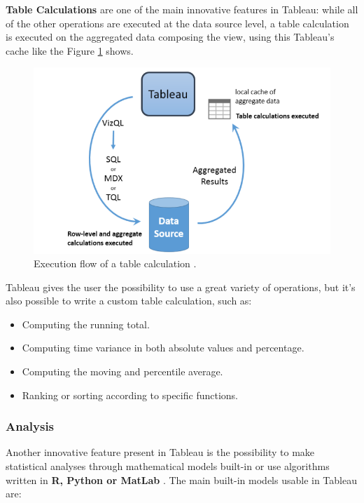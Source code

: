 \textbf{Table Calculations} are one of the main innovative features in Tableau: while all of the other operations are executed at the data source level, a table calculation is executed on the aggregated data composing the view, using this Tableau's cache like the Figure \ref{fig:TableCalculation} shows.


\begin{figure}[ht]
    \begin{center}
        \includegraphics[width=0.8\linewidth]{Figures/TableCalculation.png}
    \end{center}
    \caption{Execution flow of a table calculation \protect\cite{tableauFlow_image}.}
    \label{fig:TableCalculation}
\end{figure}

Tableau gives the user the possibility to use a great variety of operations, but it's also possible to write a custom table calculation, such as:

\begin{itemize}
    \item Computing the running total.
    \item Computing time variance in both absolute values and percentage.
    \item Computing the moving and percentile average.
    \item Ranking or sorting according to specific functions.
\end{itemize}

\subsubsection{Analysis}

Another innovative feature present in Tableau is the possibility to make statistical analyses through mathematical models built-in or use algorithms written in \textbf{R, Python or MatLab} \cite{analisi_tableau}. The main built-in models usable in Tableau are:

